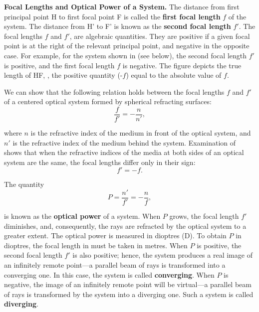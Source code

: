 \textbf{Focal Lengths and Optical Power of a System.}
The distance from first principal point H to first focal point F is called the \textbf{first focal length} $f$ of the system.
The distance from H' to F' is known as the \textbf{second focal length} $f'$.
The focal lengths $f$ and $f'$, are algebraic quantities.
They are positive if a given focal point is at the right of the relevant principal point, and negative in the opposite case.
For example, for the system shown in  (see below), the second focal length $f'$ is positive, and the first focal length $f$ is negative.
The figure depicts the true length of HF, \ie, the positive quantity (-$f$) equal to the absolute value of $f$.

We can show that the following relation holds between the focal lengths $f$ and $f'$ of a centered optical system formed by spherical refracting surfaces:
\begin{equation}\label{eq:16_57}
    \frac{f}{f'} = -\frac{n}{n'},
\end{equation}

\noindent
where $n$ is the refractive index of the medium in front of the optical system, and $n'$ is the refractive index of the medium behind the system.
Examination of  shows that when the refractive indices of the media at both sides of an optical system are the same, the focal lengths differ only in their sign:
\begin{equation}\label{eq:16_58}
    f' = -f.
\end{equation}

The quantity
\begin{equation}\label{eq:16_59}
    P = \frac{n'}{f'} = - \frac{n}{f},
\end{equation}

\noindent
is known as the \textbf{optical power} of a system.
When $P$ grows, the focal length $f'$ diminishes, and, consequently, the rays are refracted by the optical system to a greater extent.
The optical power is measured in dioptres (D).
To obtain $P$ in dioptres, the focal length in  must be taken in metres.
When $P$ is positive, the second focal length $f'$ is also positive; hence, the system produces a real image of an infinitely remote point---a parallel beam of rays is transformed into a converging one.
In this case, the system is called \textbf{converging}.
When $P$ is negative, the image of an infinitely remote point will be virtual---a parallel beam of rays is transformed by the system into a diverging one. Such a system is called \textbf{diverging}.

